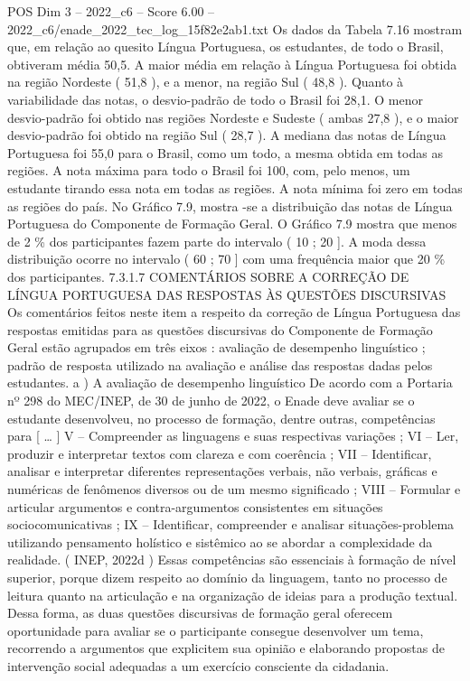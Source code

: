 \begin{textsample}{POS Dim 3 – 2022\_c6 – Score 6.00 – 2022\_c6/enade\_2022\_tec\_log\_15f82e2ab1.txt}
Os dados da Tabela 7.16 mostram que, em relação ao quesito Língua Portuguesa, os estudantes, de todo o Brasil, obtiveram média 50,5.
A maior média em relação à Língua Portuguesa foi obtida na região Nordeste ( 51,8 ), e a menor, na região Sul ( 48,8 ).
Quanto à variabilidade das notas, o desvio-padrão de todo o Brasil foi 28,1.
O menor desvio-padrão foi obtido nas regiões Nordeste e Sudeste ( ambas 27,8 ), e o maior desvio-padrão foi obtido na região Sul ( 28,7 ).
A mediana das notas de Língua Portuguesa foi 55,0 para o Brasil, como um todo, a mesma obtida em todas as regiões.
A nota máxima para todo o Brasil foi 100, com, pelo menos, um estudante tirando essa nota em todas as regiões.
A nota mínima foi zero em todas as regiões do país.
No Gráfico 7.9, mostra -se a distribuição das notas de Língua Portuguesa do Componente de Formação Geral.
O Gráfico 7.9 mostra que menos de 2 \% dos participantes fazem parte do intervalo ( 10 ; 20 ].
A moda dessa distribuição ocorre no intervalo ( 60 ; 70 ] com uma frequência maior que 20 \% dos participantes. 7.3.1.7 COMENTÁRIOS SOBRE A CORREÇÃO DE LÍNGUA PORTUGUESA DAS RESPOSTAS ÀS QUESTÕES DISCURSIVAS Os comentários feitos neste item a respeito da correção de Língua Portuguesa das respostas emitidas para as questões discursivas do Componente de Formação Geral estão agrupados em três eixos : avaliação de desempenho linguístico ; padrão de resposta utilizado na avaliação e análise das respostas dadas pelos estudantes. a ) A avaliação de desempenho linguístico De acordo com a Portaria nº 298 do MEC/INEP, de 30 de junho de 2022, o Enade deve avaliar se o estudante desenvolveu, no processo de formação, dentre outras, competências para [ … ] V – Compreender as linguagens e suas respectivas variações ; VI – Ler, produzir e interpretar textos com clareza e com coerência ; VII – Identificar, analisar e interpretar diferentes representações verbais, não verbais, gráficas e numéricas de fenômenos diversos ou de um mesmo significado ; VIII – Formular e articular argumentos e contra-argumentos consistentes em situações sociocomunicativas ; IX – Identificar, compreender e analisar situações-problema utilizando pensamento holístico e sistêmico ao se abordar a complexidade da realidade. ( INEP, 2022d ) Essas competências são essenciais à formação de nível superior, porque dizem respeito ao domínio da linguagem, tanto no processo de leitura quanto na articulação e na organização de ideias para a produção textual.
Dessa forma, as duas questões discursivas de formação geral oferecem oportunidade para avaliar se o participante consegue desenvolver um tema, recorrendo a argumentos que explicitem sua opinião e elaborando propostas de intervenção social adequadas a um exercício consciente da cidadania.

\end{textsample}
